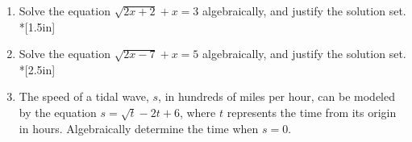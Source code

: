 \documentclass[12pt, oneside]{article}
\begin{document}
\begin{enumerate}
\newpage
\item Solve the equation $\sqrt{2x+2}+x=3$ algebraically, and justify the solution set.\\*[1.5in]


\item Solve the equation $\sqrt{2x-7}+x=5$ algebraically, and justify the solution set.\\*[2.5in]

\item The speed of a tidal wave, $s$, in hundreds of miles per hour, can be modeled by the equation $s= \sqrt{t} - 2t+6$, where $t$ represents the time from its origin in hours. Algebraically determine the time when $s=0$.\\[10pt]


\end{enumerate}
\end{document}
